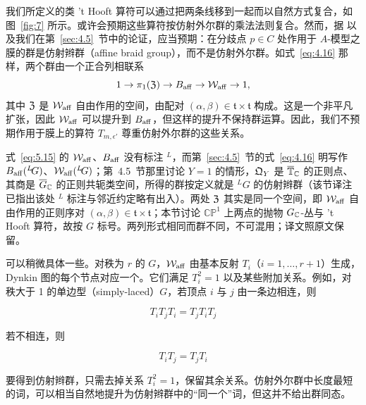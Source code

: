 我们所定义的类 't Hooft 算符可以通过把两条线移到一起而以自然方式复合，如图~\ref{fig:7} 所示。或许会预期这些算符按仿射外尔群的乘法法则复合。然而，据 \cite{ref29} 以及我们在第~\ref{sec:4.5}~节中的论证，应当预期：在分歧点 $p\in C$ 处作用于 $A$-模型之膜的群是仿射辫群（affine braid group），而不是仿射外尔群。如式~\eqref{eq:4.16} 那样，两个群由一个正合列相联系
\setcounter{equation}{14}
\begin{equation}\label{eq:5.15}
  1\to
\pi_1(\eurz)\to B_{\rm aff}\to \AffWeyl\to 1,
\end{equation}
 其中 $\eurz$ 是 $\AffWeyl$ 自由作用的空间，由配对 $(\alpha,\beta)\in \mathfrak t\times \mathfrak t$ 构成。这是一个非平凡扩张，因此 $\AffWeyl$ 可以提升到 $B_{\rm aff}$，但这样的提升不保持群运算。因此，我们不预期作用于膜上的算符 $T_{m,\epsilon'}$ 尊重仿射外尔群的这些关系。

\begin{yizhu}[易错点]
式~\eqref{eq:5.15} 的 $\AffWeyl$、$B_{\rm aff}$ 没有标注 ${}^L$，而第~\ref{sec:4.5}~节的式~\eqref{eq:4.16} 明写作 $B_{\rm aff}({}^L\neg G)$、$\AffWeyl({}^L\neg G)$；第~4.5~节那里讨论 $Y=1$ 的情形，$\eurq_Y$ 是 $\bar\TT_\C$ 的正则点、其商是 $\bar G_\C$ 的正则共轭类空间，所得的群按定义就是 ${}^L\!G$ 的仿射辫群（该节译注已指出该处 ${}^L$ 标注与邻近约定略有出入）。两处 $\eurz$ 其实是同一个空间，即 $\AffWeyl$ 自由作用的正则序对 $(\alpha,\beta)\in\mathfrak t\times\mathfrak t$；本节讨论 $\mathbb{CP}^1$ 上两点的抛物 $G_\C$-丛与 't Hooft 算符，故按 $G$ 标号。两列形式相同而群不同，不可混用；译文照原文保留。
\end{yizhu}

可以稍微具体一些。对秩为 $r$ 的 $G$，$\AffWeyl$ 由基本反射 $T_i$（$i=1,\dots,r+1$）生成，Dynkin 图的每个节点对应一个。它们满足 $T_i^2=1$ 以及某些附加关系。例如，对秩大于 1 的单边型（simply-laced）$G$，若顶点 $i$ 与 $j$ 由一条边相连，则

\setcounter{equation}{15}
\begin{equation}\label{eq:5.16}
  T_iT_jT_i=T_jT_iT_j
\end{equation}

若不相连，则

\setcounter{equation}{16}
\begin{equation}\label{eq:5.17}
  T_iT_j=T_jT_i
\end{equation}

要得到仿射辫群，只需去掉关系 $T_i^2=1$，保留其余关系。仿射外尔群中长度最短的词，可以相当自然地提升为仿射辫群中的“同一个”词，但这并不给出群同态。

